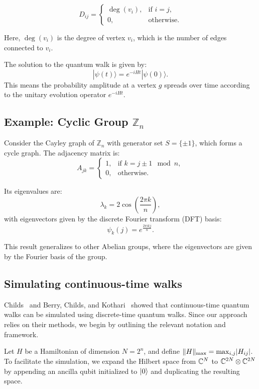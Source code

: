\documentclass[11pt]{article}
\theoremstyle{definition}
\begin{document}
\[
D_{ij} =
\begin{cases}
\deg(v_i), & \text{if } i = j, \\
0, & \text{otherwise}.
\end{cases}
\]

Here, \( \deg(v_i) \) is the degree of vertex \( v_i \), which is the number of edges connected to \( v_i \).


The solution to the quantum walk is given by:
\[
|\psi(t)\rangle = e^{-i H t} |\psi(0)\rangle.
\]
This means the probability amplitude at a vertex \( g \) spreads over time according to the unitary evolution operator \( e^{-i H t} \).


\subsection*{Example: Cyclic Group \( \mathbb{Z}_n \)}

Consider the Cayley graph of \( \mathbb{Z}_n \) with generator set \( S = \{\pm 1\} \), which forms a cycle graph. The adjacency matrix is:
\[
A_{jk} =
\begin{cases}
1, & \text{if } k = j \pm 1 \mod n, \\
0, & \text{otherwise}.
\end{cases}
\]

Its eigenvalues are:
\[
\lambda_k = 2\cos\left(\frac{2\pi k}{n}\right),
\]
with eigenvectors given by the discrete Fourier transform (DFT) basis:
\[
\psi_k(j) = e^{\frac{2\pi i k j}{n}}.
\]

This result generalizes to other Abelian groups, where the eigenvectors are given by the Fourier basis of the group.


\subsection{Simulating continuous-time walks}
Childs~\cite{childs2010relationship} and Berry, Childs, and Kothari~\cite{berry2015hamiltonian} showed that continuous-time quantum walks can be simulated using discrete-time quantum walks. Since our approach relies on their methods, we begin by outlining the relevant notation and framework.

Let \( H \) be a Hamiltonian of dimension \( N = 2^n \), and define \( \lVert H\rVert_{\mathrm{max}} = \max_{i, j} \lvert H_{ij}\rvert \). To facilitate the simulation, we expand the Hilbert space from \( \mathbb{C}^N \) to \( \mathbb{C}^{2N} \otimes \mathbb{C}^{2N} \) by appending an ancilla qubit initialized to \( \lvert0\rangle \) and duplicating the resulting space.
\end{document}
